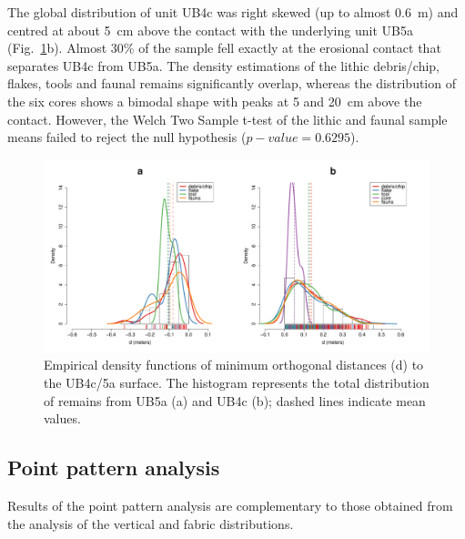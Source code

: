 \documentclass[preprint,authoryear,times]{elsarticle} %
\begin{document}
The global distribution of unit UB4c was right skewed (up to almost 0.6~m) and centred at about 5~cm above the contact with the underlying unit UB5a (Fig.~\ref{fig:10}b). Almost 30\% of the sample fell exactly at the erosional contact that separates UB4c from UB5a. The density estimations of the lithic debris/chip, flakes, tools and faunal remains significantly overlap, whereas the distribution of the six cores shows a bimodal shape with peaks at 5 and 20~cm above the contact. However, the Welch Two Sample t-test of the lithic and faunal sample means failed to reject the null hypothesis ($p-value=0.6295$). %

\begin{figure}[]
  \centering
  \includegraphics[width=1\textwidth]{../artwork/Fig10.pdf}
  \caption{Empirical density functions of minimum orthogonal distances (d) to the UB4c/5a surface. The histogram represents the total distribution of remains from UB5a (a) and UB4c (b); dashed lines indicate mean values.}
  \label{fig:10}
\end{figure}

\subsection{Point pattern analysis}

Results of the point pattern analysis are complementary to those obtained from the analysis of the vertical and fabric distributions.  

\end{document}
